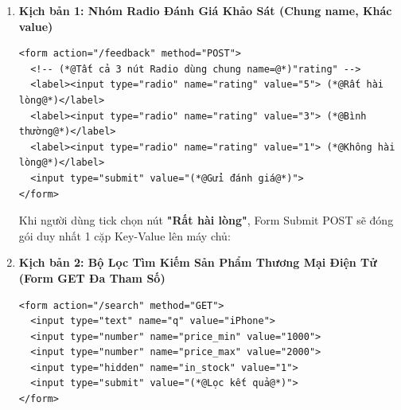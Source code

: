 \begin{enumerate}[leftmargin=1.5em, itemsep=8pt, parsep=0pt]
\item \textbf{Kịch bản 1: Nhóm Radio Đánh Giá Khảo Sát (Chung name, Khác value)}
\begin{codeWindow}
\begin{lstlisting}[language=HTML5]
<form action="/feedback" method="POST">
  <!-- (*@Tất cả 3 nút Radio dùng chung name=@*)"rating" -->
  <label><input type="radio" name="rating" value="5"> (*@Rất hài lòng@*)</label>
  <label><input type="radio" name="rating" value="3"> (*@Bình thường@*)</label>
  <label><input type="radio" name="rating" value="1"> (*@Không hài lòng@*)</label>
  <input type="submit" value="(*@Gửi đánh giá@*)">
</form>
\end{lstlisting}
\end{codeWindow}

\begin{browserWindow}
\sffamily\small
Khi người dùng tick chọn nút \textbf{"Rất hài lòng"}, Form Submit POST sẽ đóng gói duy nhất 1 cặp Key-Value lên máy chủ:
\begin{center}
\end{center}
\end{browserWindow}

\item \textbf{Kịch bản 2: Bộ Lọc Tìm Kiếm Sản Phẩm Thương Mại Điện Tử (Form GET Đa Tham Số)}
\begin{codeWindow}
\begin{lstlisting}[language=HTML5]
<form action="/search" method="GET">
  <input type="text" name="q" value="iPhone">
  <input type="number" name="price_min" value="1000">
  <input type="number" name="price_max" value="2000">
  <input type="hidden" name="in_stock" value="1">
  <input type="submit" value="(*@Lọc kết quả@*)">
</form>
\end{lstlisting}
\end{codeWindow}


\end{enumerate}
